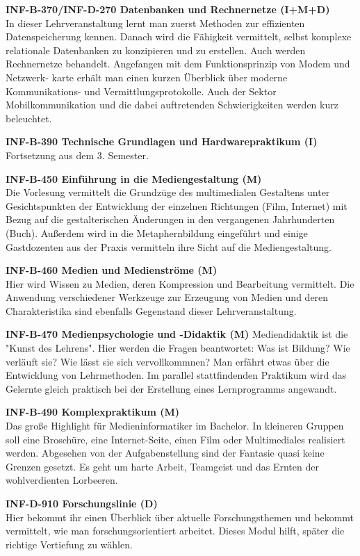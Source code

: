 \textbf{INF-B-370/INF-D-270 Datenbanken und Rechnernetze (I+M+D)} \\
In dieser Lehrveranstaltung lernt man zuerst Methoden zur effizienten Datenspeicherung kennen.
Danach wird die Fähigkeit vermittelt, selbst komplexe relationale Datenbanken zu konzipieren und zu erstellen.
Auch werden Rechnernetze behandelt.
Angefangen mit dem Funktionsprinzip von Modem und Netzwerk- karte erhält man einen kurzen Überblick über moderne Kommunikations- und Vermittlungsprotokolle.
Auch der Sektor Mobilkommunikation und die dabei auftretenden Schwierigkeiten werden kurz beleuchtet.

\textbf{INF-B-390 Technische Grundlagen und Hardwarepraktikum (I)} \\
Fortsetzung aus dem 3. Semester.

\textbf{INF-B-450 Einführung in die Mediengestaltung (M)} \\
Die Vorlesung vermittelt die Grundzüge des multimedialen Gestaltens unter Gesichtspunkten der Entwicklung der einzelnen Richtungen (Film, Internet) mit Bezug auf die gestalterischen Änderungen in den vergangenen Jahrhunderten (Buch).
Außerdem wird in die Metaphernbildung eingeführt und einige Gastdozenten aus der Praxis vermitteln ihre Sicht auf die Mediengestaltung.

\textbf{INF-B-460 Medien und Medienströme (M)} \\
Hier wird Wissen zu Medien, deren Kompression und Bearbeitung vermittelt.
Die Anwendung verschiedener Werkzeuge zur Erzeugung von Medien und deren Charakteristika sind ebenfalls Gegenstand dieser Lehrveranstaltung.

\textbf{INF-B-470 Medienpsychologie und -Didaktik (M)}
Mediendidaktik ist die "Kunst des Lehrens".
Hier werden die Fragen beantwortet:
Was ist Bildung?
Wie verläuft sie?
Wie lässt sie sich vervollkommnen?
Man erfährt etwas über die Entwicklung von Lehrmethoden.
Im parallel stattfindenden Praktikum wird das Gelernte gleich praktisch bei der Erstellung eines Lernprogramms angewandt.

\textbf{INF-B-490 Komplexpraktikum (M)} \\
Das große Highlight für Medieninformatiker im Bachelor.
In kleineren Gruppen soll eine Broschüre, eine Internet-Seite, einen Film oder Multimediales realisiert werden.
Abgesehen von der Aufgabenstellung sind der Fantasie quasi keine Grenzen gesetzt.
Es geht um harte Arbeit, Teamgeist und das Ernten der wohlverdienten Lorbeeren.

\textbf{INF-D-910 Forschungslinie (D)} \\
Hier bekommt ihr einen Überblick über aktuelle Forschungsthemen und bekommt vermittelt, wie man forschungsorientiert arbeitet.
Dieses Modul hilft, später die richtige Vertiefung zu wählen.

